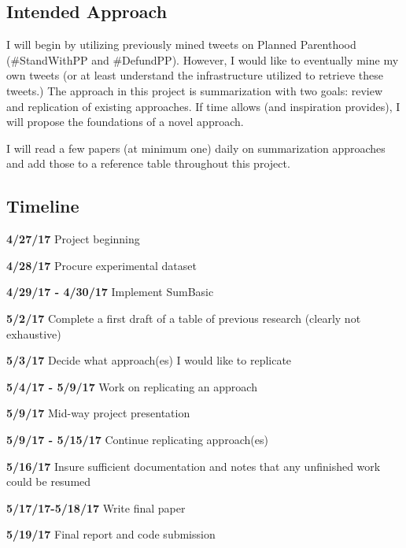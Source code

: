 \documentclass[paper=letter, fontsize=12pt]{article}
\begin{document}
\begin{multicols}{2}
\section{Intended Approach}
I will begin by utilizing previously mined tweets on Planned Parenthood (\#StandWithPP and \#DefundPP). However, I would like to eventually mine my own tweets (or at least understand the infrastructure utilized to retrieve these tweets.) The approach in this project is summarization with two goals: review and replication of existing approaches. If time allows (and inspiration provides), I will propose the foundations of a novel approach. 

I will read a few papers (at minimum one) daily on summarization approaches and add those to a reference table throughout this project.

\subsection{Timeline}
\begin{compactitem}
\item \textbf{4/27/17} Project beginning
\item \textbf{4/28/17} Procure experimental dataset
\item \textbf{4/29/17 - 4/30/17} Implement SumBasic
\item \textbf{5/2/17} Complete a first draft of a table of previous research (clearly not exhaustive)
\item \textbf{5/3/17} Decide what approach(es) I would like to replicate
\item \textbf{5/4/17 - 5/9/17} Work on replicating an approach
\item \textbf{5/9/17} Mid-way project presentation
\item \textbf{5/9/17 - 5/15/17} Continue replicating approach(es)
\item \textbf{5/16/17} Insure sufficient documentation and notes that any unfinished work could be resumed
\item \textbf{5/17/17-5/18/17} Write final paper
\item \textbf{5/19/17} Final report and code submission
\end{compactitem}

\setlength{\bibsep}{0.1pt}


\end{multicols}
\end{document}
